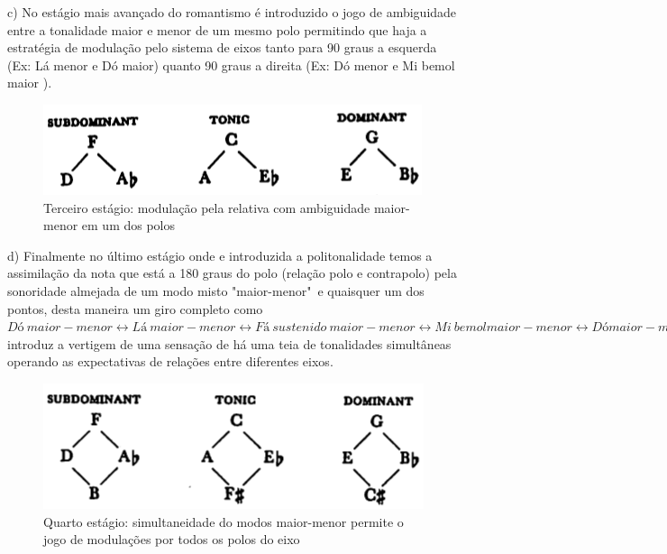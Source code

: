 \documentclass[
	12pt,				%
	openright,			%
	twoside,			%
	a4paper,			%
	english,			%
	french,				%
	spanish,			%
	brazil				%
	]{abntex2}
\begin{document}
c) No estágio mais avançado do romantismo é introduzido o jogo de ambiguidade entre a tonalidade maior e menor de um mesmo polo permitindo que haja a estratégia de modulação pelo sistema de eixos tanto para 90 graus a esquerda (Ex: Lá menor e Dó maior) quanto 90 graus a direita (Ex: Dó menor e Mi bemol maior ).

\begin{figure}[!h]
	\caption{\label{fig_grafico}Terceiro estágio: modulação pela relativa com ambiguidade maior-menor em um dos polos }
	\begin{center}
	    \includegraphics[scale=0.6]{axis/estagio03.png}
	\end{center}
\end{figure}


d) Finalmente no último estágio onde e introduzida a politonalidade temos a assimilação da nota que está a 180 graus do polo (relação polo e contrapolo) pela sonoridade almejada de um modo misto "maior-menor"\ e quaisquer um dos pontos, desta maneira um giro completo como $ Dó\ maior-menor \leftrightarrow Lá\ maior-menor \leftrightarrow Fá\ sustenido\ maior -menor \leftrightarrow Mi\ bemol maior-menor \leftrightarrow  Dó maior-menor $ introduz a vertigem de uma sensação de há uma teia de tonalidades simultâneas operando as expectativas de relações entre diferentes eixos.

\begin{figure}[!h]
	\caption{\label{fig_grafico}Quarto estágio: simultaneidade do modos maior-menor permite o jogo de modulações por todos os polos do eixo }
	\begin{center}
	    \includegraphics[scale=0.6]{axis/estagio04.png}
	\end{center}
\end{figure}
\end{document}
